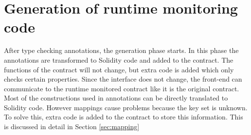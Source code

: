 \documentclass[a4paper]{article}
\begin{document}
\section{Generation of runtime monitoring code}
\label{sec:generation}
After type checking annotations, the generation phase starts. In this phase the annotations are transformed to Solidity code and added to the contract. The functions of the contract will not change, but extra code is added which only checks certain properties. Since the interface does not change, the front-end can communicate to the runtime monitored contract like it is the original contract. Most of the constructions used in annotations can be directly translated to Solidity code. However mappings cause problems because the key set is unknown. To solve this, extra code is added to the contract to store this information. This is discussed in detail in Section \ref{sec:mapping}
\end{document}
